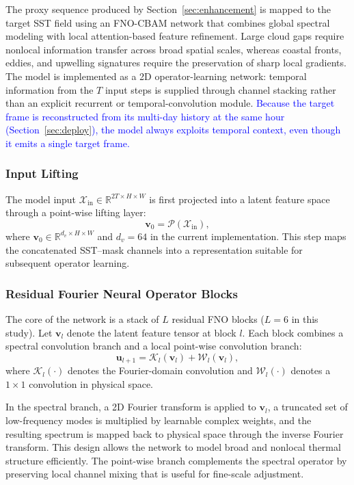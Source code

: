 \documentclass[12pt,reqno]{amsart}
\def\tb{\textcolor{blue}}
\begin{document}
The proxy sequence produced by Section~\ref{sec:enhancement} is mapped to the target SST field using an FNO-CBAM network that combines global spectral modeling with local attention-based feature refinement. Large cloud gaps require nonlocal information transfer across broad spatial scales, whereas coastal fronts, eddies, and upwelling signatures require the preservation of sharp local gradients. The model is implemented as a 2D operator-learning network: temporal information from the $T$ input steps is supplied through channel stacking rather than an explicit recurrent or temporal-convolution module. \tb{Because the target frame is reconstructed from its multi-day history at the same hour (Section~\ref{sec:deploy}), the model always exploits temporal context, even though it emits a single target frame.}

\subsubsection{Input Lifting}

The model input $\mathcal{X}_{\mathrm{in}}\in\mathbb{R}^{2T\times H\times W}$ is first projected into a latent feature space through a point-wise lifting layer:
\begin{equation}
\mathbf{v}_0 = \mathcal{P}(\mathcal{X}_{\mathrm{in}}),
\end{equation}
where $\mathbf{v}_0\in\mathbb{R}^{d_v\times H\times W}$ and $d_v=64$ in the current implementation. This step maps the concatenated SST--mask channels into a representation suitable for subsequent operator learning.

\subsubsection{Residual Fourier Neural Operator Blocks}

The core of the network is a stack of $L$ residual FNO blocks ($L=6$ in this study). Let $\mathbf{v}_l$ denote the latent feature tensor at block $l$. Each block combines a spectral convolution branch and a local point-wise convolution branch:
\begin{equation}
\mathbf{u}_{l+1} = \mathcal{K}_l(\mathbf{v}_l) + \mathcal{W}_l(\mathbf{v}_l),
\label{eq:fno_block}
\end{equation}
where $\mathcal{K}_l(\cdot)$ denotes the Fourier-domain convolution and $\mathcal{W}_l(\cdot)$ denotes a $1\times1$ convolution in physical space.

In the spectral branch, a 2D Fourier transform is applied to $\mathbf{v}_l$, a truncated set of low-frequency modes is multiplied by learnable complex weights, and the resulting spectrum is mapped back to physical space through the inverse Fourier transform. This design allows the network to model broad and nonlocal thermal structure efficiently. The point-wise branch complements the spectral operator by preserving local channel mixing that is useful for fine-scale adjustment.
\end{document}
